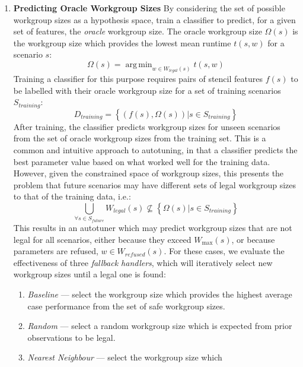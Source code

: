 \documentclass{acaces}
\DeclareMathOperator*{\argmin}{arg\,min}
\begin{document}
\begin{enumerate}
\item \textbf{Predicting Oracle Workgroup Sizes} By considering the
  set of possible workgroup sizes as a hypothesis space, train a
  classifier to predict, for a given set of features, the
  \emph{oracle} workgroup size. The oracle workgroup size $\Omega(s)$
  is the workgroup size which provides the lowest mean runtime
  $t(s,w)$ for a scenario $s$:
  \begin{equation}
    \Omega(s) = \argmin_{w \in W_{legal}(s)} t(s,w)
  \end{equation}
  Training a classifier for this purpose requires pairs of stencil
  features $f(s)$ to be labelled with their oracle workgroup size for a
  set of training scenarios $S_{training}$:
  \begin{equation}
    D_{training} = \left\{ \left(f(s), \Omega(s)\right) | s \in S_{training} \right\}
  \end{equation}
  After training, the classifier predicts workgroup sizes for unseen
  scenarios from the set of oracle workgroup sizes from the training
  set. This is a common and intuitive approach to autotuning, in that a
  classifier predicts the best parameter value based on what worked well
  for the training data. However, given the constrained space of
  workgroup sizes, this presents the problem that future scenarios may
  have different sets of legal workgroup sizes to that of the training
  data, i.e.:
  \begin{equation}
    \bigcup_{\forall s \in S_{future}} W_{legal}(s) \nsubseteq \left\{ \Omega(s) | s \in S_{training} \right\}
  \end{equation}
  This results in an autotuner which may predict workgroup sizes that
  are not legal for all scenarios, either because they exceed
  $W_{\max}(s)$, or because parameters are refused,
  $w \in W_{refused}(s)$. For these cases, we evaluate the effectiveness
  of three \emph{fallback handlers}, which will iteratively select new
  workgroup sizes until a legal one is found:
  \begin{enumerate}
  \item \emph{Baseline} --- select the workgroup size which provides the
    highest average case performance from the set of safe workgroup sizes.
  \item \emph{Random} --- select a random workgroup size which is
    expected from prior observations to be legal.
  \item \emph{Nearest Neighbour} --- select the workgroup size which

\end{enumerate}
\end{enumerate}
\end{document}
